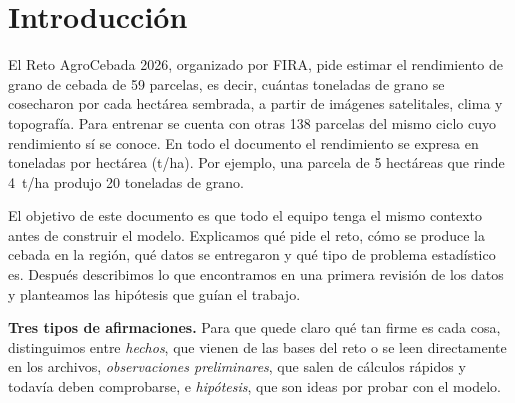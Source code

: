 \section{Introducción}\label{sec:intro}
El Reto AgroCebada 2026, organizado por FIRA, pide estimar el rendimiento de grano de cebada de 59 parcelas, es decir, cuántas toneladas de grano se cosecharon
por cada hectárea sembrada, a partir
de imágenes satelitales, clima y topografía. Para entrenar se cuenta con otras 138 parcelas del mismo ciclo cuyo
rendimiento sí se conoce. En todo el documento el rendimiento se expresa en toneladas por hectárea (t/ha). Por
ejemplo, una parcela de 5 hectáreas que rinde 4~t/ha produjo 20 toneladas de grano.

El objetivo de este documento es que todo el equipo tenga el mismo contexto antes de construir el modelo. Explicamos
qué pide el reto, cómo se produce la cebada en la región, qué datos se entregaron y qué tipo de problema estadístico
es. Después describimos lo que encontramos en una primera revisión de los datos y planteamos las hipótesis que guían
el trabajo.

\textbf{Tres tipos de afirmaciones.} Para que quede claro qué tan firme es cada cosa, distinguimos entre
\emph{hechos}, que vienen de las bases del reto o se leen directamente en los archivos, \emph{observaciones
preliminares}, que salen de cálculos rápidos y todavía deben comprobarse, e \emph{hipótesis}, que son ideas por
probar con el modelo.
